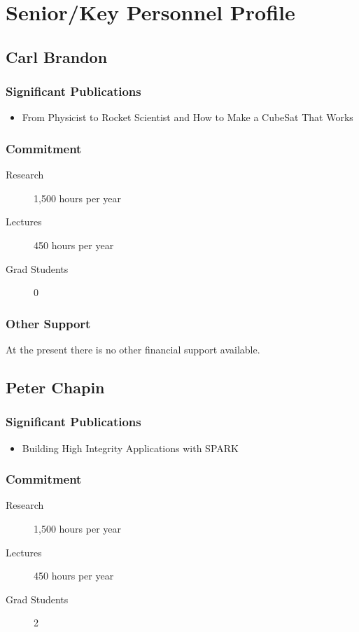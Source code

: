 \section{Senior/Key Personnel Profile}
\subsection{Carl Brandon}
\subsubsection{Significant Publications}
\begin{itemize}
\item From Physicist to Rocket Scientist and How to Make a CubeSat
  That Works \cite{brandon:2020}
\end{itemize}

\subsubsection{Commitment}
\begin{description}
\item[Research] 1,500 hours per year
\item[Lectures]   450 hours per year
\item[Grad Students] 0
\end{description}

\subsubsection{Other Support}
At the present there is no other financial support available.

\subsection{Peter Chapin}
%
\subsubsection{Significant Publications}
\begin{itemize}
\item Building High Integrity Applications with SPARK\cite{chapin:2015}
\end{itemize}

\subsubsection{Commitment}
\begin{description}
\item[Research] 1,500 hours per year
\item[Lectures]   450 hours per year
\item[Grad Students] 2
\end{description}

